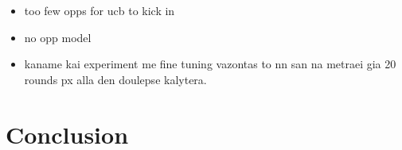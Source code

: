 \documentclass[12pt]{article}
\numberwithin{equation}{section}
\begin{document}
		\begin{itemize}
			\item too few opps for ucb to kick in
			\item no opp model
			\item kaname kai experiment me fine tuning vazontas to nn san na metraei gia 20 rounds px alla den doulepse kalytera.
		\end{itemize}

	\section{Conclusion}		\label{sec:conclusion}


	
	
\end{document}
